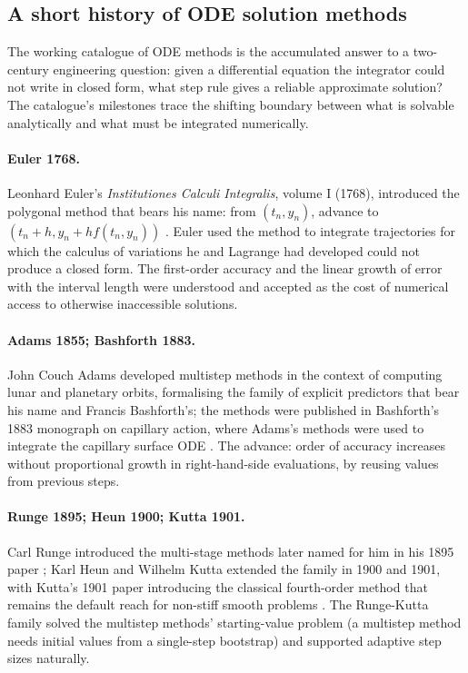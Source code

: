 \subsection{A short history of ODE solution methods}

The working catalogue of ODE methods is the accumulated answer to
a two-century engineering question: given a differential equation
the integrator could not write in closed form, what step rule
gives a reliable approximate solution? The catalogue's milestones
trace the shifting boundary between what is solvable analytically
and what must be integrated numerically.

\paragraph{Euler 1768.} Leonhard Euler's \emph{Institutiones
Calculi Integralis}, volume I (1768), introduced the polygonal
method that bears his name: from $(t_{n}, y_{n})$, advance to
$(t_{n} + h, y_{n} + h f(t_{n}, y_{n}))$ \cite{hist:v2c07-euler-1768}.
Euler used the method to integrate trajectories for which the
calculus of variations he and Lagrange had developed could not
produce a closed form. The first-order accuracy and the linear
growth of error with the interval length were understood and
accepted as the cost of numerical access to otherwise inaccessible
solutions.

\paragraph{Adams 1855; Bashforth 1883.} John Couch Adams developed
multistep methods in the context of computing lunar and planetary
orbits, formalising the family of explicit predictors that bear
his name and Francis Bashforth's; the methods were published in
Bashforth's 1883 monograph on capillary action, where Adams's
methods were used to integrate the capillary surface ODE
\cite{hist:v2c07-bashforth-adams-1883}. The advance: order of accuracy
increases without proportional growth in right-hand-side
evaluations, by reusing values from previous steps.

\paragraph{Runge 1895; Heun 1900; Kutta 1901.} Carl Runge
introduced the multi-stage methods later named for him in his
1895 paper \cite{hist:v2c07-runge-1895}; Karl Heun and Wilhelm Kutta
extended the family in 1900 and 1901, with Kutta's 1901 paper
introducing the classical fourth-order method that remains the
default reach for non-stiff smooth problems
\cite{hist:v2c07-kutta-1901}. The Runge-Kutta family solved the
multistep methods' starting-value problem (a multistep method
needs initial values from a single-step bootstrap) and supported
adaptive step sizes naturally.

